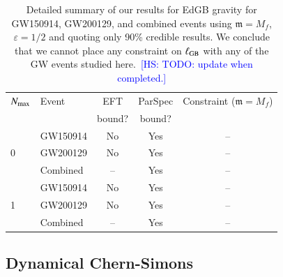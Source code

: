 \documentclass[twocolumn,
               prd,
               aps,
               superscriptaddress,
               tightenlines,
               nofootinbib,
               eqsecnum,
               amsfonts,
               amsmath,
               longbibliography]{revtex4-1}
\newcommand{\gm}{\mathfrak{m}}
\newcommand{\hs}[1]{{\textcolor{blue}{{[HS: #1]}} }}
\begin{document}
\begin{table}[h]
\begin{tabular}{l l c c c}
\hline
\hline
$N_{\rm max}$ & Event &  EFT    & ParSpec & Constraint ($\gm = M_{f}$) \\
              &       &  bound? & bound?  &                            \\
\hline
  & GW150914 & No  & Yes & -- \\
0 & GW200129 & No  & Yes & -- \\
  & Combined & --  & Yes & -- \\
\hline
  & GW150914 & No  & Yes & -- \\
1 & GW200129 & No  & Yes & -- \\
  & Combined & --  & Yes & -- \\
\hline
\hline
\end{tabular}
\caption{Detailed summary of our results for EdGB gravity for GW150914, GW200129, and
combined events using $\gm = M_{f}$, $\varepsilon = 1/2$ and quoting only 90\% credible results.
%
We conclude that we cannot place any constraint on $\ell_{\rm GB}$ with any of the GW events
studied here.~\hs{TODO: update when completed.}
}
\label{tab:summary_edgb}
\end{table}

\subsection{Dynamical Chern-Simons}
\label{sec:results_dcs}
\end{document}
